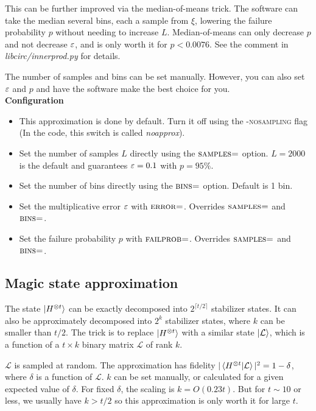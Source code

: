\documentclass[11pt]{article}
\begin{document}
This can be further improved via the median-of-means trick. The software can take the median several bins, each a sample from $\xi$, lowering the failure probability $p$ without needing to increase $L$. Median-of-means can only decrease $p$ and not decrease $\varepsilon$, and is only worth it for $p < 0.0076$. See the comment in \textit{libcirc/innerprod.py} for details.

The number of samples and bins can be set manually. However, you can also set $\varepsilon$ and $p$ and have the software make the best choice for you.\\

\noindent \textbf{Configuration}
\begin{itemize}
    \item This approximation is done by default. Turn it off using the \textsc{-nosampling} flag (In the code, this switch is called \textit{noapprox}).
    \item Set the number of samples $L$ directly using the $\textsc{samples=}$ option. $L=2000$ is the default and guarantees $\varepsilon = 0.1$ with $p = 95\%$.
    \item Set the number of bins directly using the $\textsc{bins=}$ option. Default is 1 bin.
    \item Set the multiplicative error $\varepsilon$ with $\textsc{error=}$. Overrides $\textsc{samples=}$ and $\textsc{bins=}$.
    \item Set the failure probability $p$ with $\textsc{failprob=}$. Overrides $\textsc{samples=}$ and $\textsc{bins=}$.
\end{itemize}

\subsection{Magic state approximation} \label{sec:msa}

The state $\ket{H^{\otimes t}}$ can be exactly decomposed into $2^{\lceil t/2\rceil}$ stabilizer states. It can also be approximately decomposed into  $2^{k}$ stabilizer states, where $k$ can be smaller than $t/2$. The trick is to replace $\ket{H^{\otimes t}}$ with a similar state $\ket{\mathcal{L}}$, which is a function of a $t \times k$ binary matrix $\mathcal{L}$ of rank $k$. 

$\mathcal{L}$ is sampled at random. The approximation has fidelity $|\braket{H^{\otimes t}|\mathcal{L}}|^2 = 1-\delta$, where $\delta$ is a function of $\mathcal{L}$. $k$ can be set manually, or calculated for a given expected value of $\delta$. For fixed $\delta$, the scaling is $k = O(0.23 t)$. But for $t\sim 10$ or less, we usually have $k > t/2$ so this approximation is only worth it for large $t$.
\end{document}
